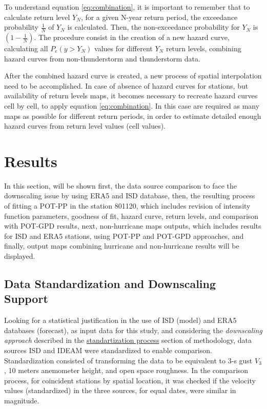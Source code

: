 \documentclass[12pt,oneside]{reedthesis}
\begin{document}
To understand equation \eqref{eq:combination}, it is important to remember that to calculate return level \(Y_N\), for a given N-year return period, the exceedance probability \(\frac{1}{N}\) of \(Y_N\) is calculated. Then, the non-exceedance probability for \(Y_N\) is \(\left(1-\frac{1}{N}\right)\). The procedure consist in the creation of a new hazard curve, calculating all \(P_e(y>Y_N)\) values for different \(Y_N\) return levels, combining hazard curves from non-thunderstorm and thunderstorm data.

After the combined hazard curve is created, a new process of spatial interpolation need to be accomplished. In case of absence of hazard curves for stations, but availability of return levels maps, it becomes necessary to recreate hazard curves cell by cell, to apply equation \eqref{eq:combination}. In this case are required as many maps as possible for different return periods, in order to estimate detailed enough hazard curves from return level values (cell values).

\hypertarget{rmd-results}{%
\chapter{Results}\label{rmd-results}}

In this section, will be shown first, the data source comparison to face the downscaling issue by using ERA5 and ISD database, then, the resulting process of fitting a POT-PP in the station 801120, which includes revision of intensity function parameters, goodness of fit, hazard curve, return levels, and comparison with POT-GPD results, next, non-hurricane maps outputs, which includes results for ISD and ERA5 stations, using POT-PP and POT-GPD approaches, and finally, output maps combining hurricane and non-hurricane results will be displayed.

\hypertarget{data-standardization-and-downscaling-support}{%
\section{Data Standardization and Downscaling Support}\label{data-standardization-and-downscaling-support}}

Looking for a statistical justification in the use of ISD (model) and ERA5 databases (forecast), as input data for this study, and considering the \emph{downscaling approach} described in the \protect\hyperlink{rmd-standartization}{standartization process} section of methodology, data sources ISD and IDEAM were standardized to enable comparison. Standardization consisted of transforming the data to be equivalent to 3-s gust \(V_3\), 10 meters anemometer height, and open space roughness. In the comparison process, for coincident stations by spatial location, it was checked if the velocity values (standardized) in the three sources, for equal dates, were similar in magnitude.
\end{document}
